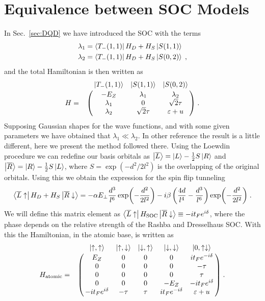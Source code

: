 \documentclass[a4paper,11pt]{article}
\begin{document}
\section{Equivalence between SOC Models}
In Sec.~\ref{sec:DQD} we have introduced the SOC with the terms
\begin{equation}
	\begin{split}
	\lambda_1&=\bra{T_-(1,1)}H_D+H_S\ket{S(1,1)}\\
	\lambda_2&=\bra{T_-(1,1)}H_D+H_S\ket{S(0,2)}\; ,
	\end{split}
\end{equation}
and the total Hamiltonian is then written as
\begin{equation}
H=\bordermatrix{~ & \ket{T_-(1,1)} & \ket{S(1,1)} & \ket{S(0,2)}\cr
	~ & -E_Z & \lambda_1 & \lambda_2 \cr
	~ & \lambda_1 & 0 & \sqrt{2}\tau \cr
	~ & \lambda_2 & \sqrt{2}\tau & \varepsilon+u \cr}\; .
\label{eq:Hamiltonian_Yue}
\end{equation}
Supposing Gaussian shapes for the wave functions, and with some given parameters we have obtained that $\lambda_1\ll\lambda_2$. In other reference \cite{Bogan2018} the result is a little different, here we present the method followed there. Using the Loewdin procedure we can redefine our basis orbitals as $\ket{\overline{L}}=\ket{L}-\frac{1}{2}S\ket{R}$ and $\ket{\overline{R}}=\ket{R}-\frac{1}{2}S\ket{L}$, where $S=\exp(-d^2/2l^2)$ is the overlapping of the original orbitals. Using this we obtain the expression for the spin flip tunneling
\begin{equation}
	\bra{\overline{L}\uparrow}H_D+H_S\ket{\overline{R}\downarrow}=-\alpha E_\perp \frac{d^3}{l^6}\exp(-\frac{d^2}{2l^2})-i\beta\left(\frac{4d}{l^4}-\frac{d^3}{l^6}\right)\exp(-\frac{d^2}{2l^2})\; .
\end{equation}
We will define this matrix element as $\bra{\overline{L}\uparrow}H_{\text{SOC}}\ket{\overline{R}\downarrow}\equiv -it_Fe^{i\delta}$, where the phase depends on the relative strength of the Rashba and Dresselhaus SOC. With this the Hamiltonian, in the atomic base, is written as
\begin{equation}
H_{\text{atomic}}=\bordermatrix{~ & \ket{\uparrow,\uparrow} & \ket{\uparrow,\downarrow} & \ket{\downarrow,\uparrow} & \ket{\downarrow,\downarrow} & \ket{0,\uparrow\downarrow}\cr
	~ & E_Z   			 & 0     & 0    & 0    			   & it_Fe^{-i\delta}  \cr
	~ & 0     			 & 0     & 0    & 0    			   & -\tau  		  	\cr
	~ & 0     			 & 0     & 0    & 0    			   & \tau 		  		\cr
	~ & 0     			 & 0     & 0    & -E_Z 			   & -it_Fe^{i\delta}   \cr
	~ & -it_Fe^{i\delta} & -\tau & \tau & it_Fe^{-i\delta} & \varepsilon+u}\; .
\end{equation}
\end{document}
